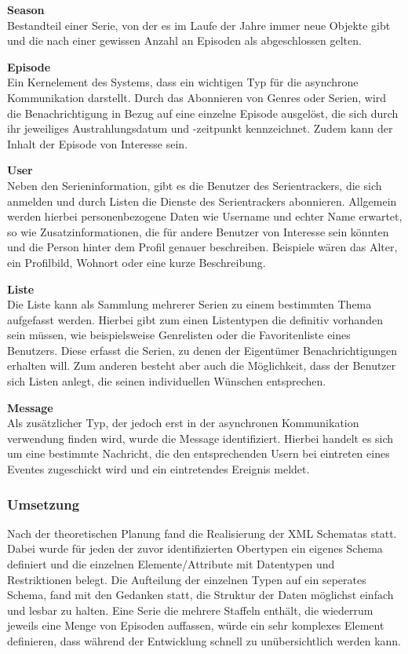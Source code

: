 \documentclass[a4paper]{article}
\begin{document}
\textbf{Season} \\
Bestandteil einer Serie, von der es im Laufe der Jahre immer neue Objekte gibt und die nach einer gewissen Anzahl an Episoden als abgeschlossen gelten.

\textbf{Episode} \\
Ein Kernelement des Systems, dass ein wichtigen Typ für die asynchrone Kommunikation darstellt. Durch das Abonnieren von Genres oder Serien, wird die Benachrichtigung in Bezug auf eine einzelne Episode ausgelöst, die sich durch ihr jeweiliges Austrahlungsdatum und -zeitpunkt kennzeichnet. 
Zudem kann der Inhalt der Episode von Interesse sein.

\textbf{User} \\
Neben den Serieninformation, gibt es die Benutzer des Serientrackers, die sich anmelden und durch Listen die Dienste des Serientrackers abonnieren.
Allgemein werden hierbei personenbezogene Daten wie Username und echter Name erwartet, so wie Zusatzinformationen, die für andere Benutzer von Interesse sein könnten und die Person hinter dem Profil genauer beschreiben. Beispiele wären das Alter, ein Profilbild, Wohnort oder eine kurze Beschreibung.

\textbf{Liste} \\
Die Liste kann als Sammlung mehrerer Serien zu einem bestimmten Thema aufgefasst werden. Hierbei gibt zum einen Listentypen die definitiv vorhanden sein müssen, wie beispielsweise Genrelisten oder die Favoritenliste eines Benutzers. Diese erfasst die Serien, zu denen der Eigentümer Benachrichtigungen erhalten will. Zum anderen besteht aber auch die Möglichkeit, dass der Benutzer sich Listen anlegt, die seinen individuellen Wünschen entsprechen.

\textbf{Message} \\
Als zusätzlicher Typ, der jedoch erst in der asynchronen Kommunikation verwendung finden wird, wurde die Message identifiziert. Hierbei handelt es sich um eine bestimmte Nachricht, die den entsprechenden Usern bei eintreten eines Eventes zugeschickt wird und ein eintretendes Ereignis meldet.



\newpage

\subsubsection{Umsetzung}

Nach der theoretischen Planung fand die Realisierung der XML Schematas statt.
Dabei wurde für jeden der zuvor identifizierten Obertypen ein eigenes Schema definiert und die einzelnen Elemente/Attribute mit Datentypen und Restriktionen belegt. Die Aufteilung der einzelnen Typen auf ein seperates Schema, fand mit den Gedanken statt, die Struktur der Daten möglichst einfach und lesbar zu halten. Eine Serie die mehrere Staffeln enthält, die wiederrum jeweils eine Menge von Episoden auffassen, würde ein sehr komplexes Element definieren, dass während der Entwicklung schnell zu unübersichtlich werden kann.
\end{document}
